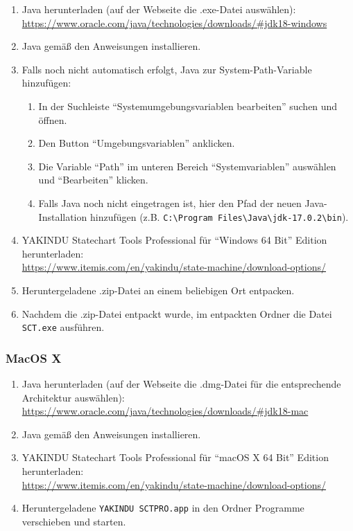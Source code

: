 \begin{enumerate}
	\setlength\topsep{-1em}
	\setlength\itemsep{-0.5em}
	\item Java herunterladen (auf der Webseite die .exe-Datei auswählen):
	\\\url{https://www.oracle.com/java/technologies/downloads/#jdk18-windows}
	\item Java gemäß den Anweisungen installieren.
	\item Falls noch nicht automatisch erfolgt, Java zur System-Path-Variable hinzufügen:
	\vspace{-0.5em}
	\begin{enumerate}
		\setlength\itemsep{-0.5em}
		\item In der Suchleiste \enquote{Systemumgebungsvariablen bearbeiten} suchen und öffnen.
		\item Den Button \enquote{Umgebungsvariablen} anklicken. 
		\item Die Variable \enquote{Path} im unteren Bereich \enquote{Systemvariablen} auswählen und \enquote{Bearbeiten} klicken. 
		\item Falls Java noch nicht eingetragen ist, hier den Pfad der neuen Java-Installation hinzufügen (z.B. \texttt{C:\textbackslash{}Program Files\textbackslash{}Java\textbackslash{}jdk-17.0.2\textbackslash{}bin}).
	\end{enumerate}
	\item YAKINDU Statechart Tools Professional für \enquote{Windows 64 Bit} Edition herunterladen:
	\\\url{https://www.itemis.com/en/yakindu/state-machine/download-options/}
	\item Heruntergeladene .zip-Datei an einem beliebigen Ort entpacken.
	\item Nachdem die .zip-Datei entpackt wurde, im entpackten Ordner die Datei \texttt{SCT.exe} ausführen.
\end{enumerate}

\subsubsection{MacOS X}

\begin{enumerate}
	\setlength\topsep{-1em}
	\setlength\itemsep{-0.5em}
	\item Java herunterladen (auf der Webseite die .dmg-Datei für die entsprechende Architektur auswählen):
	\\\url{https://www.oracle.com/java/technologies/downloads/#jdk18-mac}
	\item Java gemäß den Anweisungen installieren.
	\item YAKINDU Statechart Tools Professional für \enquote{macOS X 64 Bit} Edition herunterladen:
	\\\url{https://www.itemis.com/en/yakindu/state-machine/download-options/}
	\item Heruntergeladene \texttt{YAKINDU SCTPRO.app} in den Ordner Programme verschieben und starten.
\end{enumerate}



